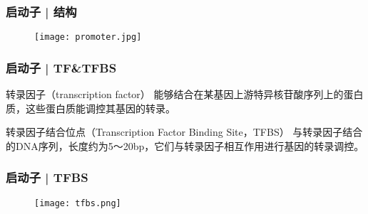 \begin{frame}
  \frametitle{启动子 | 结构}
  \begin{figure}
    \centering
    \texttt{[image: promoter.jpg]}
  \end{figure}
\end{frame}

\begin{frame}
  \frametitle{启动子 | TF\&TFBS}
  \begin{block}{转录因子（transcription factor）}
    能够结合在某基因上游特异核苷酸序列上的蛋白质，这些蛋白质能调控其基因的转录。
  \end{block}
  \pause
  \begin{block}{转录因子结合位点（Transcription Factor Binding Site，TFBS）}
    与转录因子结合的DNA序列，长度约为5～20bp，它们与转录因子相互作用进行基因的转录调控。
  \end{block}
\end{frame}

\begin{frame}
  \frametitle{启动子 | TFBS}
  \begin{figure}
    \centering
    \texttt{[image: tfbs.png]}
  \end{figure}
\end{frame}


